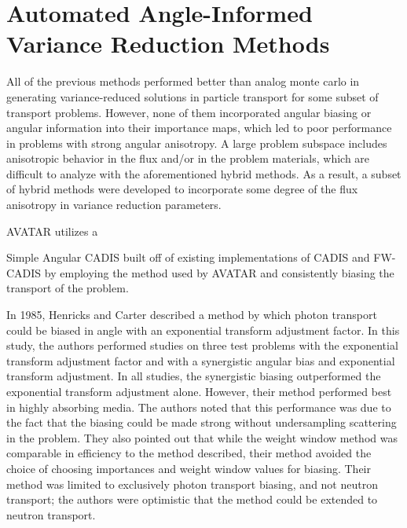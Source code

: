 \section{Automated Angle-Informed Variance Reduction Methods}
\label{sec:AngleVR}

All of the previous methods performed better than analog monte carlo in generating variance-reduced solutions in particle transport for some subset of transport problems. 
However, none of them incorporated angular biasing or angular information into their importance maps, which led to poor performance in problems with strong angular anisotropy. 
A large problem subspace includes anisotropic behavior in the flux and/or in the problem
 materials, which are difficult to analyze with the aforementioned hybrid methods. As a 
 result, a subset of hybrid methods were developed to incorporate some degree of the flux anisotropy in variance reduction parameters. 
 
 AVATAR \cite{van_riper_generation_1995, van_riper_avatarautomatic_1997} utilizes a 

%
%
Simple Angular CADIS \cite{peplow_consistent_2012} built off of existing implementations of CADIS and FW-CADIS by employing the method used by AVATAR and consistently biasing the transport of the problem. 

%
%
In 1985, Henricks and Carter \cite{hendricks_anisotropic_1985} described a method by which photon transport could be biased in angle with an exponential transform adjustment factor. 
In this study, the authors performed studies on three test problems with the exponential transform adjustment factor and with a synergistic angular bias and exponential transform adjustment. 
In all studies, the synergistic biasing outperformed the exponential transform adjustment alone. 
However, their method performed best in highly absorbing media. 
The authors noted that this performance was due to the fact that the biasing could be made strong without undersampling scattering in the problem. 
They also pointed out that while the weight window method was comparable in efficiency to the method described, their method avoided the choice of choosing importances and weight window values for biasing. Their method was limited to exclusively photon transport biasing, and not neutron transport; the authors were optimistic that the method could be extended to neutron transport. 

